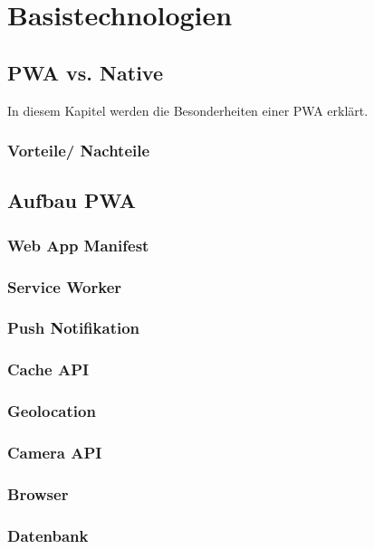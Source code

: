 \chapter{Basistechnologien}
\thispagestyle{standard}
\pagestyle{standard}
\renewcommand{\footrulewidth}{0.4pt}

\section{PWA vs. Native}

In diesem Kapitel werden die Besonderheiten einer PWA erklärt.


\subsection{Vorteile/ Nachteile}


\section{Aufbau PWA}

\subsection{Web App Manifest}


\subsection{Service Worker}


\subsection{Push Notifikation}


\subsection{Cache API}

\subsection{Geolocation}



\subsection{Camera API}

\subsection{Browser} 


\subsection{Datenbank}

\newpage